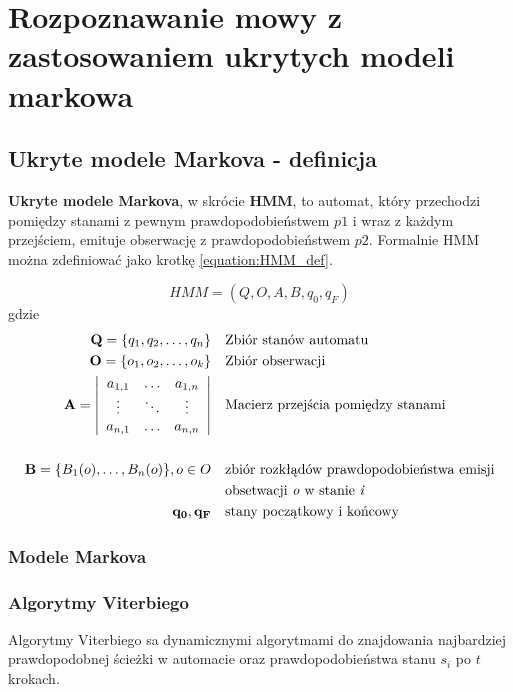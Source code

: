 \documentclass[11pt]{article}
\begin{document}
\section {Rozpoznawanie mowy z zastosowaniem ukrytych modeli markowa}
	\label{sec:ASR_HMM}
    \subsection{Ukryte modele Markova - definicja}
	    \label{sec:hmm_def}
    
	    \textbf{Ukryte modele Markova}, w skrócie \textbf{HMM}, to automat, który przechodzi pomiędzy stanami z pewnym prawdopodobieństwem $p1$ i wraz z każdym przejściem, emituje obserwację z prawdopodobieństwem $p2$. Formalnie HMM można zdefiniować jako krotkę \ref{equation:HMM_def}.
	    
	    \begin{equation}
		    HMM = (Q, O, A, B, q_0, q_F)
		    \label{equation:HMM_def}
	    \end{equation}
	    gdzie
	    \begin{align*}
		    \mathbf{Q}=\{q_1, q_2,\ldots,q_n\} & &&  \text{Zbiór stanów automatu} \\
	 	    \mathbf{O}=\{o_1, o_2,\ldots,o_k\} & &&  \text{Zbiór obserwacji} \\
	 	    \mathbf{A} =
	 	    \left| \begin{array}{ccc}
		 	    a_{1,1} & \ldots & a_{1,n} \\
		 	    \vdots  & \ddots & \vdots\\
		 	    a_{n,1} & \ldots & a_{n,n}
	 	    \end{array} \right|
												 	    & &&  \text{Macierz przejścia pomiędzy stanami} \\
												 	    & && \\
	 	    \mathbf{B}=\{B_1(o),\ldots,B_n(o)\},o \in O & && \text{zbiór rozkłądów prawdopodobieństwa emisji} \\ 
													 	& && \text{obsetwacji \textit{o} w stanie \textit{i}} \\
		 	\mathbf{q_0, q_F}				  & && \text{stany początkowy i końcowy}
	    \end{align*}
	    
    	
	    	
	   \subsubsection{Modele Markova}
	   \subsubsection{Algorytmy Viterbiego}
		   \label{sec:Viterbi}
		   Algorytmy Viterbiego sa dynamicznymi algorytmami do znajdowania najbardziej prawdopodobnej ścieżki w automacie oraz prawdopodobieństwa stanu $s_i$ po $t$ krokach. 
		   
\end{document}
